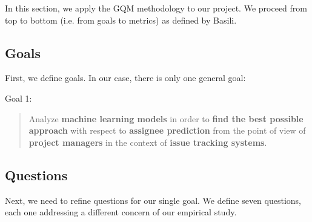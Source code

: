 In this section, we apply the GQM methodology to our project. We proceed from top to bottom (i.e. from goals to metrics) as defined by Basili.

\subsection{Goals}

First, we define goals. In our case, there is only one general goal:

\begin{framed}
  \hypertarget{goal:1}{Goal 1:}
  \begin{quote}
    Analyze \textbf{machine learning models} in order to \textbf{find the best possible approach} with respect to \textbf{assignee prediction} from the point of view of \textbf{project managers} in the context of \textbf{issue tracking systems}.
  \end{quote}
\end{framed}

\subsection{Questions}

Next, we need to refine questions for our single goal. We define seven questions, each one addressing a different concern of our empirical study.


